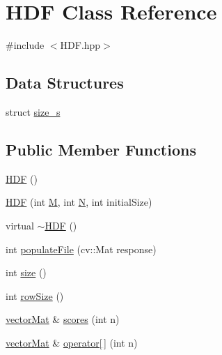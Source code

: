 \hypertarget{classHDF}{\section{H\-D\-F Class Reference}
\label{classHDF}
}


{\ttfamily \#include $<$H\-D\-F.\-hpp$>$}

\subsection*{Data Structures}
\begin{DoxyCompactItemize}
\item 
struct \hyperlink{structHDF_1_1size__s}{size\-\_\-s}
\end{DoxyCompactItemize}
\subsection*{Public Member Functions}
\begin{DoxyCompactItemize}
\item 
\hyperlink{classHDF_a1e33708a192cf30a7bf826b5d53d42cd}{H\-D\-F} ()
\item 
\hyperlink{classHDF_a0f564af287f47d1761e1bd2aaf0bdf48}{H\-D\-F} (int \hyperlink{classHDF_aee1593ceda7b33a941e52e9f6e998f51}{M}, int \hyperlink{classHDF_ab3b5c9aa5d584ac3aa16ee9c6d04c340}{N}, int initial\-Size)
\item 
virtual \hyperlink{classHDF_ad204a0f509d106b76dac0cef51eba755}{$\sim$\-H\-D\-F} ()
\item 
int \hyperlink{classHDF_a646908e15abc12f6783b8b933c0690ae}{populate\-File} (cv\-::\-Mat response)
\item 
int \hyperlink{classHDF_a33415e3a4a7b17ab5530db3335b5c6f6}{size} ()
\item 
int \hyperlink{classHDF_a131cb3f6cc240a55a2bfa903c7eaff19}{row\-Size} ()
\item 
\hyperlink{types_8hpp_a3207a7addcfa415d1c83622febcb1e9b}{vector\-Mat} \& \hyperlink{classHDF_acac60e7d2930dead3a3ccb74bb762f6f}{scores} (int n)
\item 
\hyperlink{types_8hpp_a3207a7addcfa415d1c83622febcb1e9b}{vector\-Mat} \& \hyperlink{classHDF_a35b467f435cf7b954bcf83b729553f82}{operator\mbox{[}$\,$\mbox{]}} (int n)
\end{DoxyCompactItemize}
